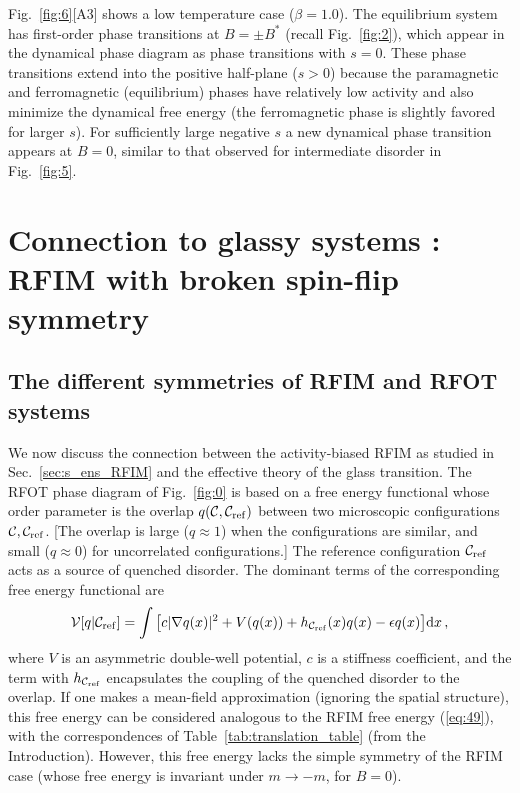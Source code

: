 \documentclass{iopart}
\newcommand{\eqref}[1]{(\ref{#1})}
\newcommand{\dst}[0]{\ensuremath{\mathrm{d}}}
\begin{document}
  Fig.~\ref{fig:6}[A3] shows a low temperature case ($\beta=1.0$). The equilibrium system has first-order phase transitions at $B=\pm B^{\ast}$ (recall Fig.~\ref{fig:2}), which appear in the dynamical phase diagram as phase transitions with $s=0$.  These phase transitions extend into the positive half-plane ($s>0$) because the paramagnetic and ferromagnetic (equilibrium) phases have relatively low activity and also minimize the dynamical free energy (the ferromagnetic phase is slightly favored for larger $s$).  For sufficiently large negative $s$ a new dynamical phase transition appears at $B=0$, similar to that observed for intermediate disorder in Fig.~\ref{fig:5}.  %
 

\section{Connection to glassy systems : RFIM with broken spin-flip symmetry}
\label{sec:asym-mob}

\subsection{The different symmetries of RFIM and RFOT systems}

We now discuss the connection between the activity-biased RFIM as studied in Sec.~\ref{sec:s_ens_RFIM} and the effective theory of the glass transition.
The RFOT phase diagram of Fig.~\ref{fig:0} is based on a free energy functional whose order parameter is the overlap $q(\mathcal{C},\mathcal{C}_{\rm ref})$ between two microscopic configurations $\mathcal{C}, \mathcal{C}_{\rm ref}$.  [The overlap is large ($q\approx 1$) when the configurations are similar, and small ($q\approx 0$) for uncorrelated configurations.]
The reference configuration $\mathcal{C}_{\rm ref}$ acts as a source of quenched disorder.  The dominant terms of the corresponding free energy functional are~\cite{franz2013glassy,biroli2014random} 
\begin{equation}
  \label{eq:48}
  \mathcal{V}[q|\mathcal{C}_{\rm ref}] = \int  \big[ c |\nabla q(x)|^{2} + V(q(x)) + h_{\mathcal{C}_{\rm ref}}(x)q(x) - \epsilon q(x)\big]  \dst x\, ,
\end{equation}
where $V$ is an asymmetric double-well potential, $c$ is a stiffness coefficient, and the term with $h_{\mathcal{C}_{\rm ref}}$ encapsulates the coupling of the quenched disorder to the overlap.   If one makes a mean-field approximation (ignoring the spatial structure), this free energy can be considered analogous to the RFIM free energy \eqref{eq:49}, with the correspondences of Table~\ref{tab:translation_table} (from the Introduction).  However, this free energy lacks the simple symmetry of the RFIM case (whose free energy is invariant under $m\to-m$, for $B=0$).
\end{document}
